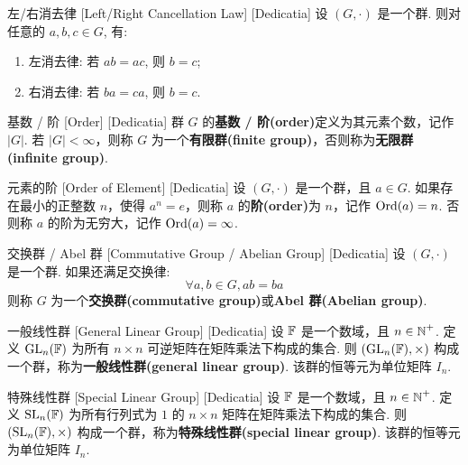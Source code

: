         \begin{ppt}
            [Cancellation]
            {左/右消去律}
            [Left/Right Cancellation Law]
            [Dedicatia]
            设 \((G,\cdot)\) 是一个群. 则对任意的 \(a,b,c\in G\), 有:
            \begin{enumerate}
                \item 左消去律: 若 \(ab=ac\), 则 \(b=c\);
                \item 右消去律: 若 \(ba=ca\), 则 \(b=c\).
            \end{enumerate}
        \end{ppt}

        \begin{dfn}
            [Order]
            {基数 / 阶}
            [Order]
            [Dedicatia]
            群 \(G\) 的\textbf{基数 / 阶(order)}定义为其元素个数，记作 \(|G|\). 若 \(|G|<\infty\)，则称 \(G\) 为一个\textbf{有限群(finite group)}，否则称为\textbf{无限群(infinite group)}.
        \end{dfn}

        \begin{dfn}
            {元素的阶}
            [Order of Element]
            [Dedicatia]
            设 \((G,\cdot)\) 是一个群，且 \(a\in G\). 如果存在最小的正整数 \(n\)，使得 \(a^n=e\)，则称 \(a\) 的\textbf{阶(order)}为 \(n\)，记作 \(\operatorname{Ord}(a)=n\). 否则称 \(a\) 的阶为无穷大，记作 \(\operatorname{Ord}(a)=\infty\).
        \end{dfn}

        \begin{dfn}
            [AbelianGroup]
            {交换群 / Abel 群}
            [Commutative Group / Abelian Group]
            [Dedicatia]
            设 \((G,\cdot)\) 是一个群. 如果还满足交换律:
            \[\forall a,b\in G, ab=ba\]
            则称 \(G\) 为一个\textbf{交换群(commutative group)}或\textbf{Abel 群(Abelian group)}.
        \end{dfn}

        \begin{ins}
            [GL]
            {一般线性群}
            [General Linear Group]
            [Dedicatia]
            设 \(\operatorname{\mathbb{F}}\) 是一个数域，且 \(n\in\operatorname{\mathbb{N}}^+\). 定义 \(\operatorname{GL}_n (\operatorname{\mathbb{F}})\) 为所有 \(n\times n\) 可逆矩阵在矩阵乘法下构成的集合. 则 \((\operatorname{GL}_n(\operatorname{\mathbb{F}}),\times)\) 构成一个群，称为\textbf{一般线性群(general linear group)}. 该群的恒等元为单位矩阵 \(I_n\).
        \end{ins}

        \begin{ins}
            [SL]
            {特殊线性群}
            [Special Linear Group]
            [Dedicatia]
            设 \(\operatorname{\mathbb{F}}\) 是一个数域，且 \(n\in\operatorname{\mathbb{N}}^+\). 定义 \(\operatorname{SL}_n (\operatorname{\mathbb{F}})\) 为所有行列式为 \(1\) 的 \(n\times n\) 矩阵在矩阵乘法下构成的集合. 则 \((\operatorname{SL}_n(\operatorname{\mathbb{F}}),\times)\) 构成一个群，称为\textbf{特殊线性群(special linear group)}. 该群的恒等元为单位矩阵 \(I_n\).
        \end{ins}

